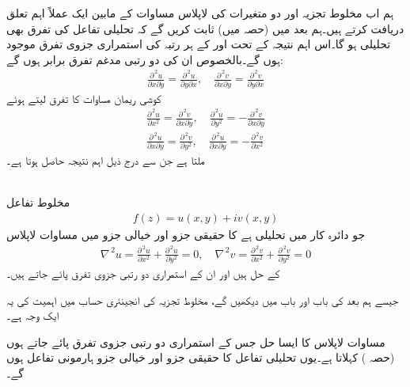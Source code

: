 ہم اب مخلوط تجزیہ اور دو متغیرات کی لاپلاس مساوات کے مابین ایک عملاً اہم تعلق دریافت کرتے ہیں۔ہم بعد میں (حصہ  میں)  ثابت کریں گے کہ تحلیلی تفاعل  کی تفرق بھی تحلیلی ہو گا۔اس اہم نتیجہ کے تحت  اور  کے ہر رتبہ کی استمراری جزوی تفرق موجود ہوں گے۔بالخصوص ان کی دو رتبی مدغم تفرق برابر ہوں گے:
\begin{align*}
\frac{\partial^{\,2}u}{\partial x\partial y}=\frac{\partial^{\,2}u}{\partial y\partial x},\quad\frac{\partial^{\,2}v}{\partial x\partial y}=\frac{\partial^{\,2}v}{\partial y\partial x}
\end{align*}
کوشی ریمان مساوات کا تفرق لیتے ہوئے
\begin{align*}
\frac{\partial^{\,2}u}{\partial x^2}=\frac{\partial^{\,2}v}{\partial x\partial y},\quad \frac{\partial^{\,2}u}{\partial y^2}=-\frac{\partial^{\,2}v}{\partial x\partial y}\\
\frac{\partial^{\,2}u}{\partial x\partial y}=\frac{\partial^{\,2}v}{\partial y^2},\quad \frac{\partial^{\,2}u}{\partial x\partial y}=-\frac{\partial^{\,2}v}{\partial x^2}
\end{align*}
ملتا ہے جن سے درج ذیل اہم نتیجہ حاصل ہوتا ہے۔

\quad {}\\
مخلوط تفاعل
\begin{align*}
f(z)=u(x,y)+iv(x,y)
\end{align*}
جو  دائرہ کار  میں تحلیلی ہے کا حقیقی جزو اور  خیالی جزو    میں مساوات لاپلاس
\begin{align*}
\nabla^{\,2}u=\frac{\partial^{\,2}u}{\partial x^2}+\frac{\partial^{\,2}u}{\partial y^2}=0,\quad \nabla^{\,2}v=\frac{\partial^{\,2}v}{\partial x^2}+\frac{\partial^{\,2}v}{\partial y^2}=0
\end{align*}
کے حل ہیں اور ان کے استمراری دو رتبی جزوی تفرق پائے جاتے ہیں۔

جیسے ہم بعد کی باب  اور باب  میں دیکھیں گے، مخلوط تجزیہ کی انجینئری  حساب میں اہمیت کی یہ ایک وجہ ہے۔

مساوات لاپلاس کا ایسا حل جس کے استمراری دو رتبی جزوی تفرق پائے جاتے ہوں   (حصہ ) کہلاتا ہے۔یوں تحلیلی تفاعل کا حقیقی  جزو اور خیالی جزو ہارمونی تفاعل ہوں گے۔

